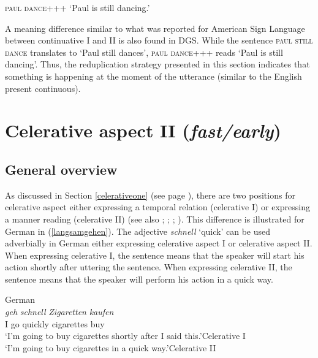 \begin{exe}
\ex \textsc{paul dance+++} 
\glt `Paul is still dancing.' \label{continuativetwodgs}
\end{exe}

\noindent A meaning difference similar to what was reported for American Sign Language between continuative I and II is also found in DGS. While the sentence \textsc{paul still dance} translates to `Paul still dances', \textsc{paul dance+++} reads `Paul is still dancing'. Thus, the reduplication strategy presented in this section indicates that something is happening at the moment of the utterance (similar to the English present continuous).


\section{Celerative aspect II (\textit{fast/early})}\label{celerativetwo}
\subsection{General overview}
As discussed in Section \ref{celerativeone} (see page \pageref{celerativeone}), there are two positions for celerative aspect either expressing a temporal relation (celerative I) or expressing a manner reading (celerative II) (see also \citealt{travis1988syntax}; \citealt[103--104]{cinque1999adverbs}; \citealt{tennyl2000core}; \citealt{ernst2002syntax}). This difference is illustrated for German in (\ref{langsamgehen}). The adjective \textit{schnell} `quick' can be used adverbially in German either expressing celerative aspect I or celerative aspect II. When expressing celerative I, the sentence means that the speaker will start his action shortly after uttering the sentence. When expressing celerative II, the sentence means that the speaker will perform his action in a quick way.



\begin{exe}
\ex German \\  {\textit{geh}} {\textit{schnell}} {\textit{Zigaretten}} {\textit{kaufen}}  \\
{I} {go} {quickly} {cigarettes} {buy}\\
\trans `I'm going to buy cigarettes shortly after I said this.'\hfill{Celerative I}\\
`I'm going to buy cigarettes in a quick way.'\hfill{Celerative II}
\label{langsamgehen}
\end{exe}

